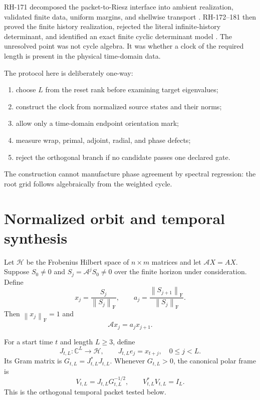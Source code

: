 \documentclass[12pt]{article}
\theoremstyle{remark}
\newcommand{\cH}{\mathcal H}
\newcommand{\norm}[1]{\left\lVert#1\right\rVert}
\newcommand{\F}{\mathrm F}
\begin{document}
RH-171 decomposed the packet-to-Riesz interface into ambient realization,
validated finite data, uniform margins, and shellwise transport
\citep{WangRH171}.  RH-172--181 then proved the finite history realization,
rejected the literal infinite-history determinant, and identified an exact
finite cyclic determinant model \citep{WangRH181}.  The unresolved point was
not cycle algebra.  It was whether a clock of the required length is present
in the physical time-domain data.

The protocol here is deliberately one-way:
\begin{enumerate}[leftmargin=2em]
\item choose $L$ from the reset rank before examining target eigenvalues;
\item construct the clock from normalized source states and their norms;
\item allow only a time-domain endpoint orientation mark;
\item measure wrap, primal, adjoint, radial, and phase defects;
\item reject the orthogonal branch if no candidate passes one declared gate.
\end{enumerate}
The construction cannot manufacture phase agreement by spectral regression:
the root grid follows algebraically from the weighted cycle.

\section{Normalized orbit and temporal synthesis}

Let $\cH$ be the Frobenius Hilbert space of $n\times m$ matrices and let
$\mathcal A X=AX$.  Suppose $S_0\ne0$ and $S_j=\mathcal A^jS_0\ne0$ over the
finite horizon under consideration.  Define
\begin{equation}\label{eq:normalized-orbit}
 x_j=\frac{S_j}{\norm{S_j}_{\F}},
 \qquad
 a_j=\frac{\norm{S_{j+1}}_{\F}}{\norm{S_j}_{\F}}.
\end{equation}
Then $\norm{x_j}_{\F}=1$ and
\begin{equation}\label{eq:normalized-step}
 \mathcal A x_j=a_jx_{j+1}.
\end{equation}

For a start time $t$ and length $L\ge3$, define
\begin{equation}\label{eq:synthesis}
 J_{t,L}:\mathbb C^L\longrightarrow\cH,
 \qquad
 J_{t,L}e_j=x_{t+j},\quad 0\le j<L.
\end{equation}
Its Gram matrix is $G_{t,L}=J_{t,L}^*J_{t,L}$.  Whenever $G_{t,L}>0$, the
canonical polar frame is
\begin{equation}\label{eq:polar-frame}
 V_{t,L}=J_{t,L}G_{t,L}^{-1/2},
 \qquad V_{t,L}^*V_{t,L}=I_L.
\end{equation}
This is the orthogonal temporal packet tested below.
\end{document}
